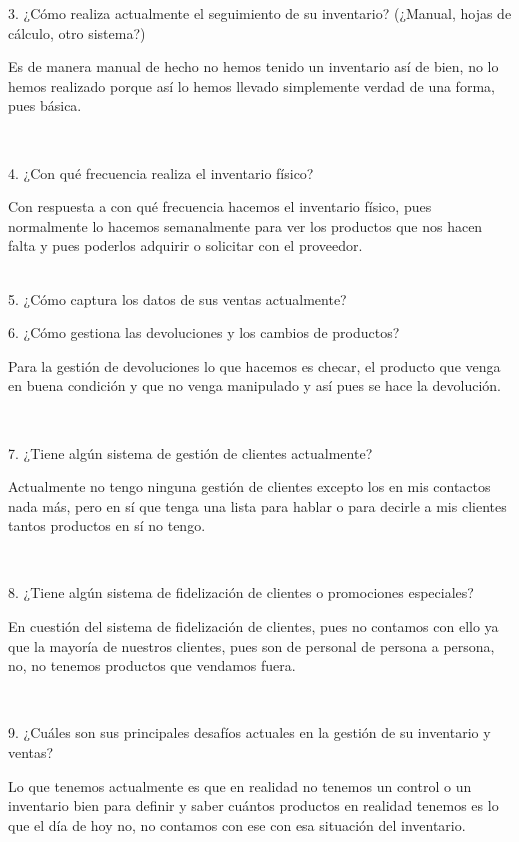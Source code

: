 \documentclass[12pt]{report}
\begin{document}
\large {
3. ¿Cómo realiza actualmente el seguimiento de su inventario? (¿Manual, hojas de cálculo, otro sistema?)

Es de manera manual de hecho no hemos tenido un inventario así de bien, no lo hemos realizado porque así lo hemos llevado simplemente verdad de una forma, pues básica.}\\[0.25cm]

\large {
4. ¿Con qué frecuencia realiza el inventario físico?

Con respuesta a con qué frecuencia hacemos el inventario físico, pues normalmente lo hacemos semanalmente para ver los productos que nos hacen falta y pues poderlos adquirir o solicitar con el proveedor.}\\[0.25cm]

\large {
5. ¿Cómo captura los datos de sus ventas actualmente?}\\[0.25cm]

\large {
6. ¿Cómo gestiona las devoluciones y los cambios de productos?

Para la gestión de devoluciones lo que hacemos es checar, el producto que venga en buena condición y que no venga manipulado y así pues se hace la devolución.}\\[0.25cm]

\large {
7. ¿Tiene algún sistema de gestión de clientes actualmente?

Actualmente no tengo ninguna gestión de clientes excepto los en mis contactos nada más, pero en sí que tenga una lista para hablar o para decirle a mis clientes tantos productos en sí no tengo.}\\[0.25cm]

\large {
8. ¿Tiene algún sistema de fidelización de clientes o promociones especiales? 

En cuestión del sistema de fidelización de clientes, pues no contamos con ello ya que la mayoría de nuestros clientes, pues son de personal de persona a persona, no, no tenemos productos que vendamos fuera.}\\[0.25cm]

\large {
9. ¿Cuáles son sus principales desafíos actuales en la gestión de su inventario y ventas?

Lo que tenemos actualmente es que en realidad no tenemos un control o un inventario bien para definir y saber cuántos productos en realidad tenemos es lo que el día de hoy no, no contamos con ese con esa situación del inventario.}\\[0.25cm]
\end{document}
